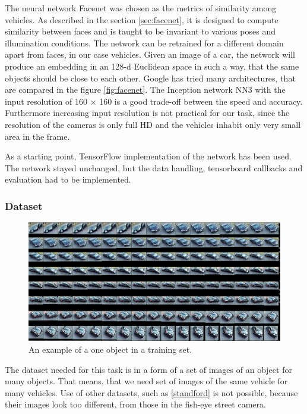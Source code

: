 \documentclass[a4paper,12pt,titlepage]{article}
\numberwithin{figure}{section}
\begin{document}
The neural network Facenet \cite{schroff2015facenet} was chosen as the metrics of similarity among vehicles. As described in the section \ref{sec:facenet}, it is designed to compute similarity between faces and is taught to be invariant to various poses and illumination conditions. The network can be retrained for a different domain apart from faces, in our case vehicles. Given an image of a car, the network will produce an embedding in an 128-d Euclidean space in such a way, that the same objects should be close to each other. Google has tried many architectures, that are compared in the figure \ref{fig:facenet}. The Inception network NN3 with the input resolution of 160 $\times$ 160 is a good trade-off between the speed and accuracy. Furthermore increasing input resolution is not practical for our task, since the resolution of the cameras is only full HD and the vehicles inhabit only  very small area in the frame.

As a starting point, TensorFlow implementation of the network \cite{facenet} has been used. The network stayed unchanged, but the data handling, tensorboard callbacks and evaluation had to be implemented.

\subsubsection{Dataset}
\begin{figure}[h!]
\centering
\includegraphics[width=1\linewidth]{fig/facenet/labeling.png}
\caption{An example of a one object in a training set.}
\label{fig:facenet-labeling}
\end{figure}

The dataset needed for this task is in a form of a set of images of an object for many objects. That means, that we need set of images of the same vehicle for many vehicles. Use of other datasets, such as \ref{standford} is not possible, because their images look too different, from those in the fish-eye street camera.
\end{document}
